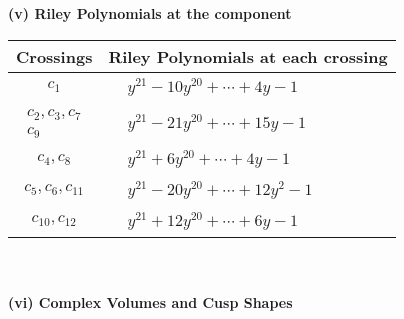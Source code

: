 \documentclass[1p]{elsarticle_modified}
\theoremstyle{definition}
\begin{document}
\newpage\renewcommand{\arraystretch}{1}
\flushleft \textbf{(v) Riley Polynomials at the component}\newline \\
\begin{tabular}{m{50pt}|m{274pt}}
Crossings & \hspace{64pt}Riley Polynomials at each crossing \\
\hline $$\begin{aligned}c_{1}\end{aligned}$$&$\begin{aligned}
&y^{21}-10 y^{20}+\cdots+4 y-1
\end{aligned}$\\
\hline $$\begin{aligned}c_{2},c_{3},c_{7}\\c_{9}\end{aligned}$$&$\begin{aligned}
&y^{21}-21 y^{20}+\cdots+15 y-1
\end{aligned}$\\
\hline $$\begin{aligned}c_{4},c_{8}\end{aligned}$$&$\begin{aligned}
&y^{21}+6 y^{20}+\cdots+4 y-1
\end{aligned}$\\
\hline $$\begin{aligned}c_{5},c_{6},c_{11}\end{aligned}$$&$\begin{aligned}
&y^{21}-20 y^{20}+\cdots+12 y^2-1
\end{aligned}$\\
\hline $$\begin{aligned}c_{10},c_{12}\end{aligned}$$&$\begin{aligned}
&y^{21}+12 y^{20}+\cdots+6 y-1
\end{aligned}$\\
\hline
\end{tabular}\\~\\
\newpage\flushleft \textbf{(vi) Complex Volumes and Cusp Shapes}
\end{document}
